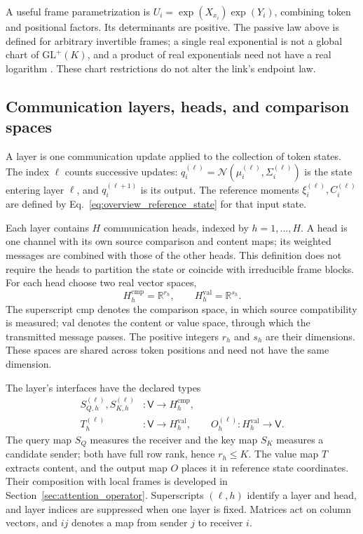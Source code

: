 \documentclass[twoside,11pt]{article}
\begin{document}
A useful frame parametrization is \(U_i=\exp(X_{x_i})\exp(Y_i)\), combining token and positional factors. Its determinants are positive. The passive law above is defined for arbitrary invertible frames; a single real exponential is not a global chart of \(\mathrm{GL}^+(K)\), and a product of real exponentials need not have a real logarithm \citep{culver1966existence}. These chart restrictions do not alter the link's endpoint law.

\subsection{Communication layers, heads, and comparison spaces}
\label{sec:role_measurements}

A layer is one communication update applied to the collection of token states. The index \(\ell\) counts successive updates: \(q_i^{(\ell)}=\mathcal N(\mu_i^{(\ell)},\Sigma_i^{(\ell)})\) is the state entering layer \(\ell\), and \(q_i^{(\ell+1)}\) is its output. The reference moments \(\xi_i^{(\ell)},C_i^{(\ell)}\) are defined by Eq.~\eqref{eq:overview_reference_state} for that input state.

Each layer contains \(H\) communication heads, indexed by \(h=1,\ldots,H\). A head is one channel with its own source comparison and content maps; its weighted messages are combined with those of the other heads. This definition does not require the heads to partition the state or coincide with irreducible frame blocks. For each head choose two real vector spaces,
\begin{equation}
H_h^{\mathrm{cmp}}=\mathbb R^{r_h},
\qquad
H_h^{\mathrm{val}}=\mathbb R^{s_h}.
\label{eq:head_channel_spaces}
\end{equation}
The superscript \(\mathrm{cmp}\) denotes the comparison space, in which source compatibility is measured; \(\mathrm{val}\) denotes the content or value space, through which the transmitted message passes. The positive integers \(r_h\) and \(s_h\) are their dimensions. These spaces are shared across token positions and need not have the same dimension.

The layer's interfaces have the declared types
\begin{align}
S_{Q,h}^{(\ell)},S_{K,h}^{(\ell)}
&:\mathsf V\longrightarrow H_h^{\mathrm{cmp}},\\
T_h^{(\ell)}&:\mathsf V\longrightarrow H_h^{\mathrm{val}},
\qquad
O_h^{(\ell)}:H_h^{\mathrm{val}}\longrightarrow\mathsf V.
\label{eq:head_interface_types}
\end{align}
The query map \(S_Q\) measures the receiver and the key map \(S_K\) measures a candidate sender; both have full row rank, hence \(r_h\le K\). The value map \(T\) extracts content, and the output map \(O\) places it in reference state coordinates. Their composition with local frames is developed in Section~\ref{sec:attention_operator}. Superscripts \((\ell,h)\) identify a layer and head, and layer indices are suppressed when one layer is fixed. Matrices act on column vectors, and \(ij\) denotes a map from sender \(j\) to receiver \(i\).
\end{document}
